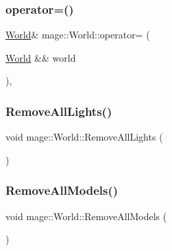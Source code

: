 \hypertarget{classmage_1_1_world_a0440e945dfd0291174ce6dc33e5d8335}{}\label{classmage_1_1_world_a0440e945dfd0291174ce6dc33e5d8335} 
\subsubsection{\texorpdfstring{operator=()}{operator=()}\hspace{0.1cm}{\footnotesize\ttfamily [2/2]}}
{\footnotesize\ttfamily \hyperlink{classmage_1_1_world}{World}\& mage\+::\+World\+::operator= (\begin{DoxyParamCaption}\item[{\hyperlink{classmage_1_1_world}{World} \&\&}]{world }\end{DoxyParamCaption})\hspace{0.3cm}{\ttfamily [private]}, {\ttfamily [delete]}}

\hypertarget{classmage_1_1_world_a5fafe529414d511e88b98ccd8e2f951f}{}\label{classmage_1_1_world_a5fafe529414d511e88b98ccd8e2f951f} 
\subsubsection{\texorpdfstring{Remove\+All\+Lights()}{RemoveAllLights()}}
{\footnotesize\ttfamily void mage\+::\+World\+::\+Remove\+All\+Lights (\begin{DoxyParamCaption}{ }\end{DoxyParamCaption})}

\hypertarget{classmage_1_1_world_af3bae7b62192de9edda5e0567b73be93}{}\label{classmage_1_1_world_af3bae7b62192de9edda5e0567b73be93} 
\subsubsection{\texorpdfstring{Remove\+All\+Models()}{RemoveAllModels()}}
{\footnotesize\ttfamily void mage\+::\+World\+::\+Remove\+All\+Models (\begin{DoxyParamCaption}{ }\end{DoxyParamCaption})}

\hypertarget{classmage_1_1_world_a06f60650aa7992f44167043d1aa2e576}{}\label{classmage_1_1_world_a06f60650aa7992f44167043d1aa2e576} 
